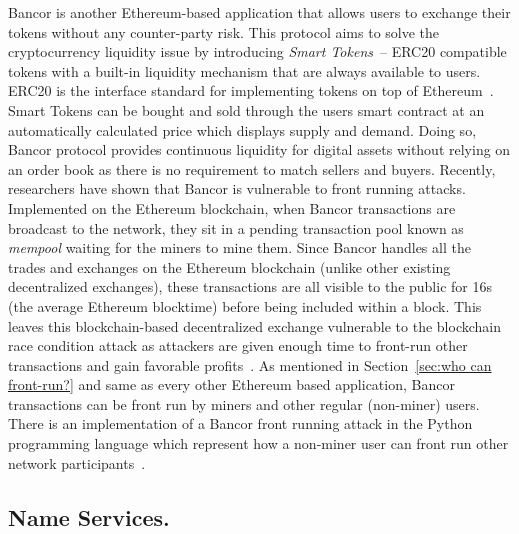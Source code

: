 Bancor is another Ethereum-based application that allows users to exchange their tokens without any counter-party risk. This protocol aims to solve the cryptocurrency liquidity issue by introducing \textit{Smart Tokens}~\cite{hertzog2017bancor}-- ERC20 compatible tokens with a built-in liquidity mechanism that are always available to users. ERC20 is the interface standard for implementing tokens on top of Ethereum~\cite{erc20}. Smart Tokens can be bought and sold through the users smart contract at an automatically calculated price which displays supply and demand. Doing so, Bancor protocol provides continuous liquidity for digital assets without relying on an order book as there is no requirement to match sellers and buyers.
Recently, researchers have shown that Bancor is vulnerable to front running attacks. Implemented on the Ethereum blockchain, when Bancor transactions are broadcast to the network, they sit in a pending transaction pool known as \textit{mempool} waiting for the miners to mine them. Since Bancor handles all the trades and exchanges on the Ethereum blockchain (unlike other existing decentralized exchanges), these transactions are all visible to the public for 16s (the average Ethereum blocktime) before being included within a block. This leaves this blockchain-based decentralized exchange vulnerable to the blockchain race condition attack as attackers are given enough time to front-run other transactions and gain favorable profits~\cite{BancorIs7:online}. As mentioned in Section~\ref{sec:who can front-run?} and same as every other Ethereum based application, Bancor transactions can be front run by miners and other regular (non-miner) users. There is an implementation of a Bancor front running attack in the Python programming language which represent how a non-miner user can front run other network participants~\cite{NewTab13:online}.
\subsection{Name Services.}

